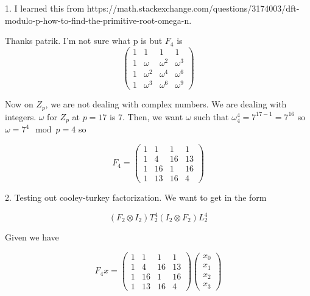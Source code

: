 \documentclass{article}
\begin{document}
	1. I learned this from https://math.stackexchange.com/questions/3174003/dft-modulo-p-how-to-find-the-primitive-root-omega-n.
	
	Thanks patrik. I'm not sure what p is but $F_4$ is
	\begin{equation}
		\begin{pmatrix}
			1 & 1 & 1 & 1 \\
			1 & \omega & \omega^2 & \omega^3 \\
			1 & \omega^2 & \omega^4 & \omega^6 \\
			1 & \omega^3 & \omega^6 & \omega^9 
		\end{pmatrix}
	\end{equation}

	Now on $Z_p$, we are not dealing with complex numbers. We are dealing with integers. $\omega$ for $Z_p$ at $p=17$ is 7. Then, we want $\omega$ such that $\omega_4^4 = 7^{17-1}=7^16$ so $\omega=7^4 \mod p=4$ so
	
	\begin{equation}
		F_4=\begin{pmatrix}
			1 & 1 & 1 & 1 \\
			1 & 4 & 16 & 13 \\
			1 & 16 & 1 & 16 \\
			1 & 13 & 16 & 4
		\end{pmatrix}
	\end{equation}
	
	2. Testing out cooley-turkey factorization. We want to get in the form
	
	\begin{equation}
		(F_2 \otimes I_2)T_2^4(I_2 \otimes F_2)L_2^4
	\end{equation}
	
	Given we have
	
	\begin{equation}
		F_4x=\begin{pmatrix}
			1 & 1 & 1 & 1 \\
			1 & 4 & 16 & 13 \\
			1 & 16 & 1 & 16 \\
			1 & 13 & 16 & 4
		\end{pmatrix}
		\begin{pmatrix}
			x_0 \\
			x_1 \\
			x_2 \\
			x_3
		\end{pmatrix}
	\end{equation}
\end{document}
